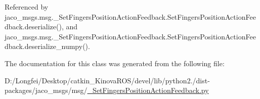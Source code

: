 Referenced by jaco\+\_\+msgs.\+msg.\+\_\+\+Set\+Fingers\+Position\+Action\+Feedback.\+Set\+Fingers\+Position\+Action\+Feedback.\+deserialize(), and jaco\+\_\+msgs.\+msg.\+\_\+\+Set\+Fingers\+Position\+Action\+Feedback.\+Set\+Fingers\+Position\+Action\+Feedback.\+deserialize\+\_\+numpy().



The documentation for this class was generated from the following file\+:\begin{DoxyCompactItemize}
\item 
D\+:/\+Longfei/\+Desktop/catkin\+\_\+\+Kinova\+R\+O\+S/devel/lib/python2./dist-\/packages/jaco\+\_\+msgs/msg/\hyperlink{__SetFingersPositionActionFeedback_8py}{\+\_\+\+Set\+Fingers\+Position\+Action\+Feedback.\+py}\end{DoxyCompactItemize}
